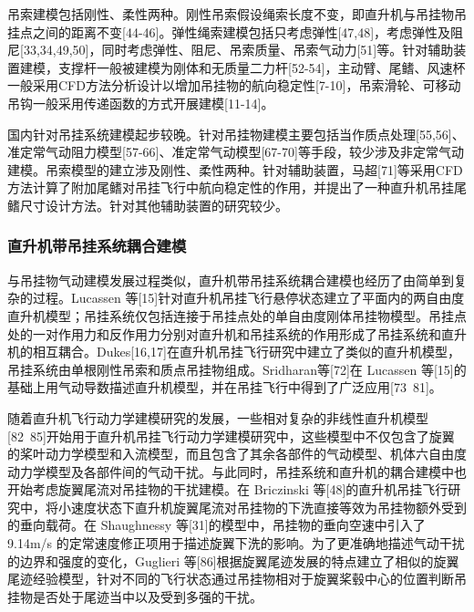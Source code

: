 吊索建模包括刚性、柔性两种。刚性吊索假设绳索长度不变，即直升机与吊挂物吊挂点之间的距离不变[44-46]。弹性绳索建模包括只考虑弹性[47,48]，考虑弹性及阻尼[33,34,49,50]，同时考虑弹性、阻尼、吊索质量、吊索气动力[51]等。针对辅助装置建模，支撑杆一般被建模为刚体和无质量二力杆[52-54]，主动臂、尾鳍、风速杯一般采用CFD方法分析设计以增加吊挂物的航向稳定性[7-10]，吊索滑轮、可移动吊钩一般采用传递函数的方式开展建模[11-14]。

国内针对吊挂系统建模起步较晚。针对吊挂物建模主要包括当作质点处理[55,56]、准定常气动阻力模型[57-66]、准定常气动模型[67-70]等手段，较少涉及非定常气动建模。吊索模型的建立涉及刚性、柔性两种。针对辅助装置，马超[71]等采用CFD方法计算了附加尾鳍对吊挂飞行中航向稳定性的作用，并提出了一种直升机吊挂尾鳍尺寸设计方法。针对其他辅助装置的研究较少。

\subsubsection{直升机带吊挂系统耦合建模}
与吊挂物气动建模发展过程类似，直升机带吊挂系统耦合建模也经历了由简单到复杂的过程。Lucassen 等[15]针对直升机吊挂飞行悬停状态建立了平面内的两自由度直升机模型；吊挂系统仅包括连接于吊挂点处的单自由度刚体吊挂物模型。吊挂点处的一对作用力和反作用力分别对直升机和吊挂系统的作用形成了吊挂系统和直升机的相互耦合。Dukes[16,17]在直升机吊挂飞行研究中建立了类似的直升机模型，吊挂系统由单根刚性吊索和质点吊挂物组成。Sridharan等[72]在 Lucassen 等[15]的基础上用气动导数描述直升机模型，并在吊挂飞行中得到了广泛应用[73~81]。

随着直升机飞行动力学建模研究的发展，一些相对复杂的非线性直升机模型[82~85]开始用于直升机吊挂飞行动力学建模研究中，这些模型中不仅包含了旋翼的桨叶动力学模型和入流模型，而且包含了其余各部件的气动模型、机体六自由度动力学模型及各部件间的气动干扰。与此同时，吊挂系统和直升机的耦合建模中也开始考虑旋翼尾流对吊挂物的干扰建模。在 Briczinski 等[48]的直升机吊挂飞行研究中，将小速度状态下直升机旋翼尾流对吊挂物的下洗直接等效为吊挂物额外受到的垂向载荷。在 Shaughnessy 等[31]的模型中，吊挂物的垂向空速中引入了 9.14m/s 的定常速度修正项用于描述旋翼下洗的影响。为了更准确地描述气动干扰的边界和强度的变化，Guglieri 等[86]根据旋翼尾迹发展的特点建立了相似的旋翼尾迹经验模型，针对不同的飞行状态通过吊挂物相对于旋翼桨毂中心的位置判断吊挂物是否处于尾迹当中以及受到多强的干扰。

